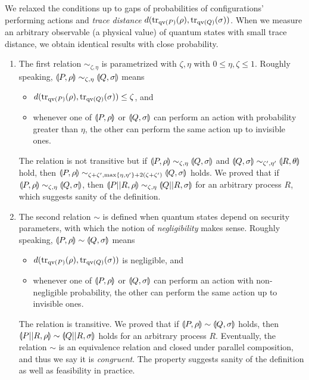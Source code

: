 We relaxed the conditions up to gaps of probabilities of
configurations' performing actions and {\it trace distance}
$d({\rm tr}_{\mathrm{qv}(P)}(\rho), {\rm tr}_{\mathrm{qv}(Q)}(\sigma))$.
When we measure an arbitrary observable (a physical value)
of quantum states with small trace distance,
we obtain identical results with close probability.
\begin{enumerate}
 \item  The first relation $\sim_{\zeta, \eta}$ is
	parametrized with $\zeta, \eta$ with $0 \le 
	\eta, \zeta \le 1$. Roughly speaking,
	$\llparenthesis P, \rho \rrparenthesis \sim_{\zeta, \eta} \llparenthesis Q, \sigma \rrparenthesis$
	means
	\begin{itemize}
	 \item $d({\rm tr}_{\mathrm{qv}(P)}(\rho), {\rm tr}_{\mathrm{qv}(Q)}(\sigma)) \le
	       \zeta$, and
	 \item whenever one of $\llparenthesis P, \rho \rrparenthesis$ or $\llparenthesis Q, \sigma \rrparenthesis$
	       can perform an action with probability greater than
	       $\eta$,
	       the other can perform the same action up to
	       invisible ones.
	\end{itemize}
	The relation is not transitive but
	if $\llparenthesis P, \rho \rrparenthesis \sim_{\zeta, \eta} \llparenthesis Q, \sigma \rrparenthesis$
	and $\llparenthesis Q, \sigma \rrparenthesis \sim_{\zeta', \eta'} \llparenthesis R, \theta \rrparenthesis$
	hold, then $\llparenthesis P, \rho \rrparenthesis
	\sim_{\zeta + \zeta', \max\{\eta, \eta'\} + 2(\zeta + \zeta')}
	\llparenthesis Q, \sigma \rrparenthesis$
	holds.
	We proved that if $\llparenthesis P, \rho \rrparenthesis \sim_{\zeta, \eta}
	\llparenthesis Q, \sigma \rrparenthesis$, then 
	$\llparenthesis P||R, \rho \rrparenthesis \sim_{\zeta, \eta} \llparenthesis Q||R, \sigma \rrparenthesis$
	for an arbitrary process $R$,
	which suggests sanity of the
	definition.
 \item The second relation $\sim$ is defined when
       quantum states depend on security
       parameters, with which the notion of {\it negligibility}
       makes sense. Roughly speaking,
       $\llparenthesis P, \rho \rrparenthesis \sim \llparenthesis Q, \sigma \rrparenthesis$ means
       \begin{itemize}
	\item $d({\rm tr}_{\mathrm{qv}(P)}(\rho), {\rm tr}_{\mathrm{qv}(Q)}(\sigma))$
	      is negligible, and
	\item whenever one of $\llparenthesis P, \rho \rrparenthesis$ or $\llparenthesis Q, \sigma \rrparenthesis$
	      can perform an action with
	      non-negligible probability,
	      the other can perform the same action up to invisible
	      ones.
       \end{itemize}
       The relation is transitive.
       We proved that if $\llparenthesis P, \rho \rrparenthesis \sim
       \llparenthesis Q, \sigma \rrparenthesis$ holds, then \\
       $\llparenthesis P||R, \rho \rrparenthesis \sim \llparenthesis Q||R, \sigma \rrparenthesis$ holds
       for an arbitrary process $R$. 
       Eventually, the relation $\sim$ is an equivalence 
       relation and closed under
       parallel composition, and thus we say it is {\it congruent}.
       The property suggests sanity of the definition as
       well as feasibility in practice.
\end{enumerate}
